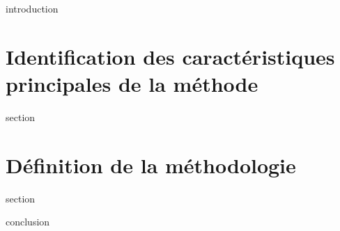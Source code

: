 \chaptertoc{}

\label{sec:4-int}
{introduction}

\section{Identification des caractéristiques principales de la
  méthode}
\label{sec:4-1}
{section}

\section{Définition de la méthodologie}
\label{sec:4-2}
{section}

\label{sec:4-cnc}
{conclusion}

